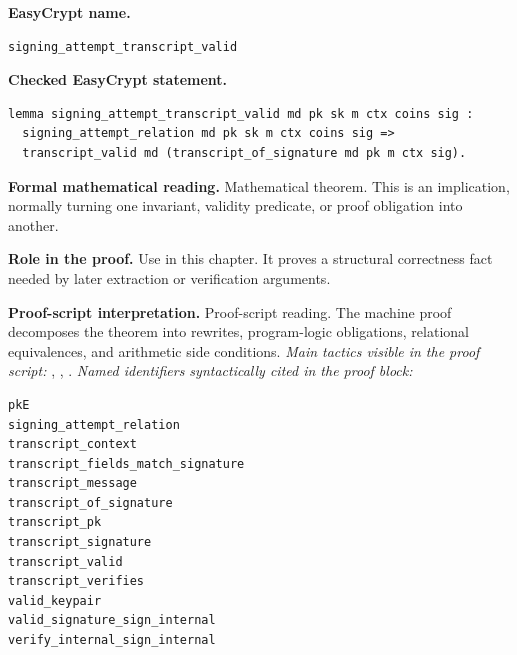 \begin{formaltheorem}
\noindent\textbf{EasyCrypt name.}
\begin{lstlisting}[language=EasyCrypt,basicstyle=\ttfamily\scriptsize]
signing_attempt_transcript_valid
\end{lstlisting}
\noindent\textbf{Checked EasyCrypt statement.}
\begin{lstlisting}[language=EasyCrypt,basicstyle=\ttfamily\scriptsize]
lemma signing_attempt_transcript_valid md pk sk m ctx coins sig :
  signing_attempt_relation md pk sk m ctx coins sig =>
  transcript_valid md (transcript_of_signature md pk m ctx sig).
\end{lstlisting}
\noindent\textbf{Formal mathematical reading.}
Mathematical theorem. This is an implication, normally turning one invariant, validity predicate, or proof obligation into another.

\noindent\textbf{Role in the proof.}
Use in this chapter. It proves a structural correctness fact needed by later extraction or verification arguments.

\noindent\textbf{Proof-script interpretation.}
Proof-script reading. The machine proof decomposes the theorem into rewrites, program-logic obligations, relational equivalences, and arithmetic side conditions.
\emph{Main tactics visible in the proof script:} , , .
\emph{Named identifiers syntactically cited in the proof block:}
\begin{lstlisting}[language=EasyCrypt,basicstyle=\ttfamily\scriptsize]
pkE
signing_attempt_relation
transcript_context
transcript_fields_match_signature
transcript_message
transcript_of_signature
transcript_pk
transcript_signature
transcript_valid
transcript_verifies
valid_keypair
valid_signature_sign_internal
verify_internal_sign_internal
\end{lstlisting}

\end{formaltheorem}

